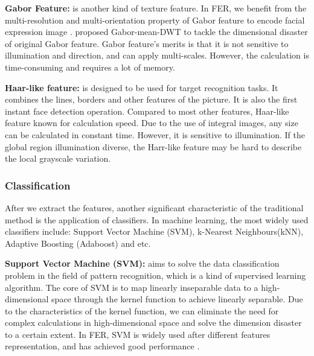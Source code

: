 \textbf{Gabor Feature:} is another kind of texture feature. In FER, we benefit from the multi-resolution and multi-orientation property of Gabor feature to encode facial expression image \citep{lyonsCodingFacialExpressions1998}. \citeauthor{mattelaFacialExpressionRecognition2018} proposed Gabor-mean-DWT to tackle the dimensional disaster of original Gabor feature. Gabor feature's merits is that it is not sensitive to illumination and direction, and can apply multi-scales. However, the calculation is time-consuming and requires a lot of memory.

\textbf{Haar-like feature:} is designed to be used for target recognition tasks. It combines the lines, borders and other features of the picture. It is also the first instant face detection operation. Compared to most other features, Haar-like feature  known for calculation speed. Due to the use of integral images, any size can be calculated in constant time. However, it is sensitive to illumination. If the global region illumination diverse, the Harr-like feature may be hard to describe the local grayscale variation.


\subsubsection{Classification}
After we extract the features, another significant characteristic of the traditional method is the application of classifiers. In machine learning, the most widely used classifiers include: Support Vector Machine (SVM), k-Nearest Neighbours(kNN), Adaptive Boosting (Adaboost) and etc.

\textbf{Support Vector Machine (SVM):} aims to solve the data classification problem in the field of pattern recognition, which is a kind of supervised learning algorithm. The core of SVM is to map linearly inseparable data to a high-dimensional space through the kernel function to achieve linearly separable. Due to the characteristics of the kernel function, we can eliminate the need for complex calculations in high-dimensional space and solve the  dimension disaster to a certain extent. In FER, SVM is widely used after different features representation, and has achieved good performance \citep*{michelRealTimeFacial2003,tsaiFacialExpressionRecognition2018,hsiehEffectiveSemanticFeatures2016,saeedEmpiricalEvaluationSVM2018}.

